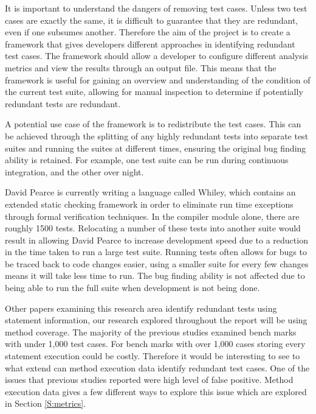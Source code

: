 It is important to understand the dangers of removing test cases. Unless two test cases are exactly the same, it is difficult to guarantee that they are redundant, even if one subsumes another. Therefore the aim of the project is to create a framework that gives developers different approaches in identifying redundant test cases. The framework should allow a developer to configure different analysis metrics and view the results through an output file. This means that the framework is useful for gaining an overview and understanding of the condition of the current test suite, allowing for manual inspection to determine if potentially redundant tests are redundant.

A potential use case of the framework is to redistribute the test cases. This can be achieved through the splitting of any highly redundant tests into separate test suites and running the suites at different times, ensuring the original bug finding ability is retained. For example, one test suite can be run during continuous integration, and the other over night.

David Pearce is currently writing a language called Whiley, which contains an extended static checking framework in order to eliminate run time exceptions through formal verification techniques. In the compiler module alone, there are roughly 1500 tests. Relocating a number of these tests into another suite would result in allowing David Pearce to increase development speed due to a reduction in the time taken to run a large test suite. Running tests often allows for bugs to be traced back to code changes easier, using a smaller suite for every few changes means it will take less time to run. The bug finding ability is not affected due to being able to run the full suite when development is not being done. 

Other papers examining this research area identify redundant tests using statement information, our research explored throughout the report will be using method coverage. The majority of the previous studies examined bench marks with under 1,000 test cases. For bench marks with over 1,000 cases storing every statement execution could be costly. Therefore it would be interesting to see to what extend can method execution data identify redundant test cases. One of the issues that previous studies reported were high level of false positive. Method execution data gives a few different ways to explore this issue which are explored in Section \ref{S:metrics}.

